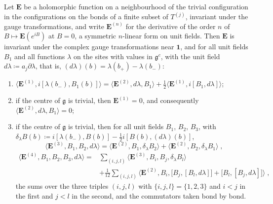 \documentclass[11pt]{preprint}
\newcommand{\id}{\mathbf 1}
\numberwithin{equation}{section}
\begin{document}
\begin{lemma}\label{lem:ward}
Let $\mathbf E$ be a holomorphic function on a neighbourhood of the trivial configuration in the configurations on the bonds of a finite subset of $T^{(j)}$, invariant under the gauge transformations, and write $\mathbf E^{(n)}$ for the derivative of the order $n$ of $B \mapsto \mathbf E(e^{iB})$ at $B = 0$, a symmetric $n$-linear form on unit fields. Then $\mathbf E$ is invariant under the complex gauge transformations near $\id$, and for all unit fields $B_1$ and all functions $\lambda$ on the sites with values in $\mathfrak g^c$, with the unit field $d\lambda \coloneqq a_j\partial\lambda$, that is, $(d\lambda)(b) = \lambda(b_+) - \lambda(b_-)$:
\begin{enumerate}[label=(\roman*)]
\item $\langle\mathbf E^{(1)}, i[\lambda(b_-), B_1(b)]\rangle = \langle\mathbf E^{(2)}, d\lambda, B_1\rangle + \frac{1}{2}\langle\mathbf E^{(1)}, i[B_1, d\lambda]\rangle$;
\item if the centre of $\mathfrak g$ is trivial, then $\mathbf E^{(1)} = 0$, and consequently $\langle\mathbf E^{(2)}, d\lambda, B_1\rangle = 0$;
\item if the centre of $\mathfrak g$ is trivial, then for all unit fields $B_1$, $B_2$, $B_3$, with $\delta_\lambda B(b) \coloneqq i[\lambda(b_-), B(b)] - \frac{1}{2}i[B(b), (d\lambda)(b)]$,
\begin{equation}\label{eq:ward-three}
    \langle\mathbf E^{(3)}, B_1, B_2, d\lambda\rangle = \langle\mathbf E^{(2)}, B_1, \delta_\lambda B_2\rangle + \langle\mathbf E^{(2)}, B_2, \delta_\lambda B_1\rangle\;,
\end{equation}
\begin{equation}\label{eq:ward-four}
\begin{aligned}
    \langle\mathbf E^{(4)}, B_1, B_2, B_3, d\lambda\rangle ={}& \sum_{(i,j,l)}\langle\mathbf E^{(3)}, B_i, B_j, \delta_\lambda B_l\rangle\\
    &+ \frac{1}{12}\sum_{(i,j,l)}\bigl\langle\mathbf E^{(2)}, B_i, \bigl[B_j, [B_l, d\lambda]\bigr] + \bigl[B_l, [B_j, d\lambda]\bigr]\bigr\rangle\;,
\end{aligned}
\end{equation}
the sums over the three triples $(i, j, l)$ with $\{ i, j, l \} = \{ 1, 2, 3 \}$ and $i < j$ in the first and $j < l$ in the second, and the commutators taken bond by bond.
\end{enumerate}
\end{lemma}
\end{document}
